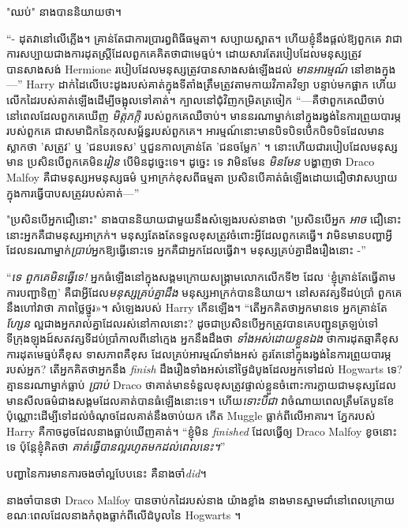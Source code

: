 {{{{{{"ឈប់" នាងបាននិយាយថា។

“- ដុតវានៅលើភ្លើង។ គ្រាន់តែជាការប្រារព្ធពិធីធម្មតា។ សប្បាយស្អាត។ ហើយខ្ញុំនឹងផ្តល់ឱ្យពួកគេ វាជាការសប្បាយជាងការដុតស្ត្រីដែលពួកគេគិតថាជាមេធ្មប់។ ដោយសារតែរបៀបដែលមនុស្សត្រូវបានសាងសង់ Hermione របៀបដែលមនុស្សត្រូវបានសាងសង់ឡើងដល់ \emph{មានអារម្មណ៍} នៅខាងក្នុង—” Harry ដាក់ដៃលើបេះដូងរបស់គាត់ក្នុងទីតាំងត្រឹមត្រូវតាមកាយវិភាគវិទ្យា បន្ទាប់មកផ្អាក ហើយលើកដៃរបស់គាត់ឡើងដើម្បីចង្អុលទៅគាត់។ ក្បាលនៅជុំវិញកម្រិតត្រចៀក “—គឺថាពួកគេឈឺចាប់នៅពេលដែលពួកគេឃើញ \emph{មិត្តភក្តិ} របស់ពួកគេឈឺចាប់។ មាននរណាម្នាក់នៅក្នុងរង្វង់នៃការព្រួយបារម្ភរបស់ពួកគេ ជាសមាជិកនៃកុលសម្ព័ន្ធរបស់ពួកគេ។ អារម្មណ៍​នោះ​មាន​បិទ​បិទ​បើក​បិទ​បិទ​ដែល​មាន​ស្លាក​ថា 'សត្រូវ' ឬ 'ជនបរទេស' ឬ​ជួនកាល​គ្រាន់តែ 'ជនចម្លែក' ។ នោះហើយជារបៀបដែលមនុស្សមាន ប្រសិនបើពួកគេមិន\emph{រៀន} បើមិនដូច្នេះទេ។ ដូច្នេះ ទេ វាមិនមែន \emph{មិនមែន} បង្ហាញថា Draco Malfoy គឺជាមនុស្សអមនុស្សធម៌ ឬអាក្រក់ខុសពីធម្មតា ប្រសិនបើគាត់ធំឡើងដោយជឿថាវាសប្បាយក្នុងការធ្វើបាបសត្រូវរបស់គាត់—”

"ប្រសិនបើអ្នកជឿនោះ" នាងបាននិយាយជាមួយនឹងសំឡេងរបស់នាងថា "ប្រសិនបើអ្នក \emph{អាច} ជឿនោះ នោះអ្នកគឺជាមនុស្សអាក្រក់។ មនុស្សតែងតែទទួលខុសត្រូវចំពោះអ្វីដែលពួកគេធ្វើ។ វាមិនមានបញ្ហាអ្វីដែលនរណាម្នាក់\emph{ប្រាប់}អ្នកឱ្យធ្វើនោះទេ អ្នកគឺជាអ្នកដែលធ្វើវា។ មនុស្សគ្រប់គ្នាដឹងរឿងនោះ -”

“\emph{ទេ ពួកគេមិនធ្វើទេ!} អ្នកធំឡើងនៅក្នុងសង្គមក្រោយសង្គ្រាមលោកលើកទី២ ដែល ‘ខ្ញុំគ្រាន់តែធ្វើតាមការបញ្ជាទិញ’ គឺជាអ្វីដែល\emph{មនុស្សគ្រប់គ្នាដឹង} មនុស្សអាក្រក់បាននិយាយ។ នៅសតវត្សទីដប់ប្រាំ ពួកគេនឹងហៅវាថា ភាពថ្លៃថ្នូរ»។ សំឡេងរបស់ Harry កើនឡើង។ “តើ​អ្នក​គិត​ថា​អ្នក​មាន​ទេ អ្នក​គ្រាន់​តែ​\emph{ហ្សែន} ល្អ​ជាង​អ្នក​រាល់​គ្នា​ដែល​រស់​នៅ​កាល​នោះ? ដូចជាប្រសិនបើអ្នកត្រូវបានគេបញ្ជូនត្រឡប់ទៅទីក្រុងឡុងដ៍សតវត្សទីដប់ប្រាំកាលពីនៅក្មេង អ្នកនឹងដឹងថា \emph{ទាំងអស់ដោយខ្លួនឯង} ថាការដុតឆ្មាគឺខុស ការដុតមេធ្មប់គឺខុស ទាសភាពគឺខុស ដែលគ្រប់អារម្មណ៍ទាំងអស់ គួរតែនៅក្នុងរង្វង់នៃការព្រួយបារម្ភរបស់អ្នក? តើអ្នកគិតថាអ្នកនឹង \emph{finish} ដឹងរឿងទាំងអស់នៅថ្ងៃដំបូងដែលអ្នកទៅដល់ Hogwarts ទេ? គ្មាននរណាម្នាក់ធ្លាប់ \emph{ប្រាប់} Draco ថាគាត់មានទំនួលខុសត្រូវផ្ទាល់ខ្លួនចំពោះការក្លាយជាមនុស្សដែលមានសីលធម៌ជាងសង្គមដែលគាត់បានធំឡើងនោះទេ។ ហើយ\emph{ទោះបីជា} វាចំណាយពេលត្រឹមតែបួនខែប៉ុណ្ណោះដើម្បីទៅដល់ចំណុចដែលគាត់នឹងចាប់យក កើត Muggle ធ្លាក់ពីលើអាគារ។ ភ្នែករបស់ Harry គឺកាចដូចដែលនាងធ្លាប់ឃើញគាត់។ “ខ្ញុំមិន \emph{finished} ដែលធ្វើឲ្យ Draco Malfoy ខូចនោះទេ ប៉ុន្តែខ្ញុំគិតថា \emph{គាត់ធ្វើបានល្អរហូតមកដល់ពេលនេះ។}”

បញ្ហានៃការមានការចងចាំល្អបែបនេះ គឺនាងចាំ\emph{did}។

នាងចាំបានថា Draco Malfoy បានចាប់កដៃរបស់នាង យ៉ាងខ្លាំង នាងមានស្នាមជាំនៅពេលក្រោយ ខណៈពេលដែលនាងកំពុងធ្លាក់ពីលើដំបូលនៃ Hogwarts ។

}}}}}}
